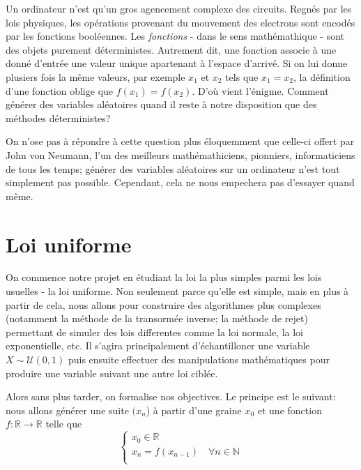 \documentclass[10pt]{article} %
\begin{document}
Un ordinateur n'est qu'un gros agencement complexe des circuits. Regnés par les lois physiques, les opérations provenant du mouvement des electrons
sont encodés par les fonctions booléennes. Les \textit{fonctions} - dans le sens mathémathique - sont des objets purement déterministes. Autrement dit,
une fonction associe à une donné d'entrée une valeur unique apartenant à l'espace d'arrivé. Si on lui donne plusiers fois la même valeurs, par exemple $x_1$ et $x_2$
tels que $x_1 = x_2$, la définition d'une fonction oblige que $f(x_1) = f(x_2)$. D'où vient l'énigme. Comment générer des variables aléatoires quand il reste à notre
disposition que des méthodes déterministes?

On n'ose pas à répondre à cette question plus éloquemment que celle-ci offert par John von Neumann, l'un des meilleurs mathémathiciens, pionniers, informaticiens de tous les temps; générer des variables aléatoires sur un ordinateur n'est tout simplement pas possible.
Cependant, cela ne nous empechera pas d'essayer quand même.

\section{Loi uniforme}

On commence notre projet en étudiant la loi la plus simples parmi les lois usuelles - la loi uniforme. Non seulement parce qu'elle est simple, mais en plus à partir de cela, nous allons
pour construire des algorithmes plus complexes (notamment la méthode de la transormée inverse; la méthode de rejet) permettant de simuler des
lois differentes comme la loi normale, la loi exponentielle, etc. Il s'agira principalement d'échantilloner une variable $X\sim \mathcal{U}(0, 1)$ puis ensuite effectuer des manipulations
mathématiques pour produire une variable suivant une autre loi ciblée.

Alors sans plus tarder, on formalise nos objectives. Le principe est le suivant: nous allons générer une suite $(x_n$) à partir d'une graine $x_0$ et une fonction $f : \mathbb{R} \longrightarrow \mathbb{R}$ telle que
$$
\left\{
    \begin{array}{ll}
        x_{0} \in \mathbb{R} \\
        x_{n} = f(x_{n - 1})  \quad \forall n \in \mathbb{N} \\
    \end{array}
\right.
$$
\end{document}
